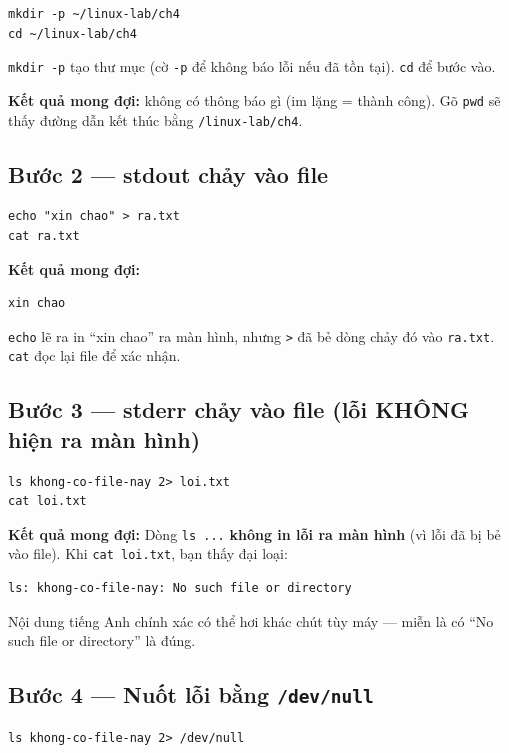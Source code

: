 \documentclass[12pt,a4paper]{article}
\newcommand{\cmd}[1]{\texttt{#1}}
\begin{document}
\begin{Verbatim}
mkdir -p ~/linux-lab/ch4
cd ~/linux-lab/ch4
\end{Verbatim}

\cmd{mkdir -p} tạo thư mục (cờ \cmd{-p} để không báo lỗi nếu đã tồn tại). \cmd{cd} để bước vào.

\textbf{Kết quả mong đợi:} không có thông báo gì (im lặng = thành công). Gõ \cmd{pwd} sẽ thấy đường dẫn kết thúc bằng \cmd{/linux-lab/ch4}.

\subsection{Bước 2 --- stdout chảy vào file}

\begin{Verbatim}
echo "xin chao" > ra.txt
cat ra.txt
\end{Verbatim}

\textbf{Kết quả mong đợi:}
\begin{Verbatim}
xin chao
\end{Verbatim}
\cmd{echo} lẽ ra in ``xin chao'' ra màn hình, nhưng \cmd{>} đã bẻ dòng chảy đó vào \cmd{ra.txt}. \cmd{cat} đọc lại file để xác nhận.

\subsection{Bước 3 --- stderr chảy vào file (lỗi KHÔNG hiện ra màn hình)}

\begin{Verbatim}
ls khong-co-file-nay 2> loi.txt
cat loi.txt
\end{Verbatim}

\textbf{Kết quả mong đợi:} Dòng \cmd{ls ...} \textbf{không in lỗi ra màn hình} (vì lỗi đã bị bẻ vào file). Khi \cmd{cat loi.txt}, bạn thấy đại loại:
\begin{Verbatim}
ls: khong-co-file-nay: No such file or directory
\end{Verbatim}
Nội dung tiếng Anh chính xác có thể hơi khác chút tùy máy --- miễn là có ``No such file or directory'' là đúng.

\subsection{Bước 4 --- Nuốt lỗi bằng \texttt{/dev/null}}

\begin{Verbatim}
ls khong-co-file-nay 2> /dev/null
\end{Verbatim}
\end{document}
